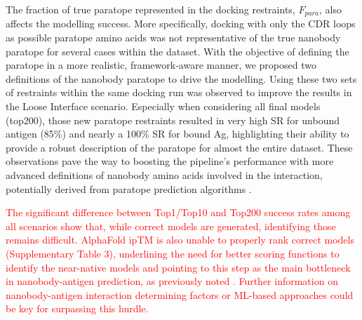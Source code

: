 \documentclass[12pt]{article}
\begin{document}
The fraction of true paratope represented in the docking restraints, $F_{para}$, also affects the modelling success. More specifically, docking with only the CDR loops as possible paratope amino acids was not representative of the true nanobody paratope for several cases within the dataset. With the objective of defining the paratope in a more realistic, framework-aware manner, we proposed two definitions of the nanobody paratope to drive the modelling. Using these two sets of restraints within the same docking run was observed to improve the results in the Loose Interface scenario. Especially when considering all final models (top200), those new paratope restraints resulted in very high SR for unbound antigen (85\%) and nearly a 100\% SR for bound Ag, highlighting their ability to provide a robust description of the paratope for almost the entire dataset. These observations pave the way to boosting the pipeline's performance with more advanced definitions of nanobody amino acids involved in the interaction, potentially derived from paratope prediction algorithms \cite{li2024nanoberta}.

\textcolor{Red}{The significant difference between Top1/Top10 and Top200 success rates among all scenarios show that, while correct models are generated, identifying those remains difficult. AlphaFold ipTM is also unable to properly rank correct models (Supplementary Table 3), underlining the need for better scoring functions to identify the near-native models and pointing to this step as the main bottleneck in nanobody-antigen prediction, as previously noted \cite{Xu2026deeprankab, Smorodina2026iptm}. Further information on nanobody-antigen interaction determining factors or ML-based approaches could be key for surpassing this hurdle.}
\end{document}

